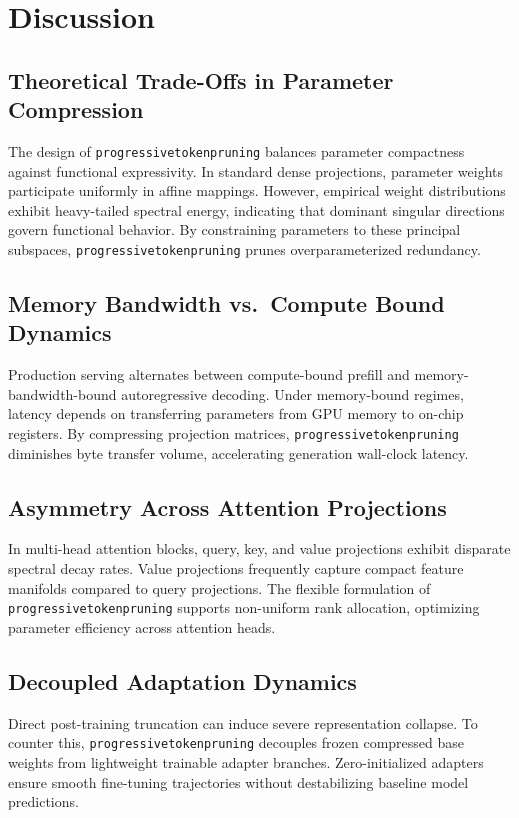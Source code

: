 \section{Discussion}

\subsection{Theoretical Trade-Offs in Parameter Compression}
The design of \texttt{progressivetokenpruning} balances parameter compactness against functional expressivity. In standard dense projections, parameter weights participate uniformly in affine mappings. However, empirical weight distributions exhibit heavy-tailed spectral energy, indicating that dominant singular directions govern functional behavior. By constraining parameters to these principal subspaces, \texttt{progressivetokenpruning} prunes overparameterized redundancy.

\subsection{Memory Bandwidth vs.\ Compute Bound Dynamics}
Production serving alternates between compute-bound prefill and memory-bandwidth-bound autoregressive decoding. Under memory-bound regimes, latency depends on transferring parameters from GPU memory to on-chip registers. By compressing projection matrices, \texttt{progressivetokenpruning} diminishes byte transfer volume, accelerating generation wall-clock latency.

\subsection{Asymmetry Across Attention Projections}
In multi-head attention blocks, query, key, and value projections exhibit disparate spectral decay rates. Value projections frequently capture compact feature manifolds compared to query projections. The flexible formulation of \texttt{progressivetokenpruning} supports non-uniform rank allocation, optimizing parameter efficiency across attention heads.

\subsection{Decoupled Adaptation Dynamics}
Direct post-training truncation can induce severe representation collapse. To counter this, \texttt{progressivetokenpruning} decouples frozen compressed base weights from lightweight trainable adapter branches. Zero-initialized adapters ensure smooth fine-tuning trajectories without destabilizing baseline model predictions.

